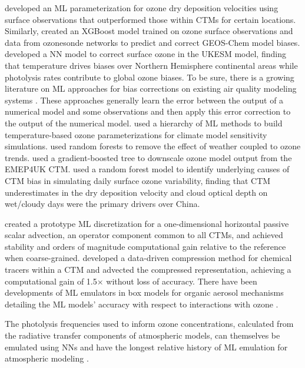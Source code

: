 \documentclass[gmd, manuscript]{copernicus}
\begin{document}
\citet{silva_deep_2019} developed an ML parameterization for ozone dry deposition velocities using surface observations that outperformed those within CTMs for certain locations. Similarly, \citet{ivatt_improving_2020} created an XGBoost model trained on ozone surface observations and data from ozonesonde networks to predict and correct GEOS-Chem model biases. \citet{liu_correcting_2022} developed a NN model to correct surface ozone in the UKESM model, finding that temperature drives biases over Northern Hemisphere continental areas while photolysis rates contribute to global ozone biases. To be sure, there is a growing literature on ML approaches for bias corrections on existing air quality modeling systems \citep{Neal2014, Borrego2011, Silibello2015}. These approaches generally learn the error between the output of a numerical model and some observations and then apply this error correction to the output of the numerical model. \citet{nowack_using_2018} used a hierarchy of ML methods to build temperature-based ozone parameterizations for climate model sensitivity simulations. \citet{colombi_why_2023} used random forests to remove the effect of weather coupled to ozone trends. \citet{Gouldsbrough2024} used a gradient-boosted tree to downscale ozone model output from the EMEP4UK CTM. \citet{ye_diagnosing_2022} used a random forest model to identify underlying causes of CTM bias in simulating daily surface ozone variability, finding that CTM underestimates in the dry deposition velocity and cloud optical depth on wet/cloudy days were the primary drivers over China. 
 
\citet{park_learned_2023} created a prototype ML discretization for a one-dimensional horizontal passive scalar advection, an operator component common to all CTMs, and achieved stability and orders of magnitude computational gain relative to the reference when coarse-grained. \citet{sturm_advecting_2023} developed a data-driven compression method for chemical tracers within a CTM and advected the compressed representation, achieving a computational gain of 1.5$\times$ without loss of accuracy. There have been developments of ML emulators in box models for organic aerosol mechanisms detailing the ML models’ accuracy with respect to interactions with ozone \citep{mouchel-vallon_toward_2023, schreck_neural_2022}.
 
The photolysis frequencies used to inform ozone concentrations, calculated from the radiative transfer components of atmospheric models, can themselves be emulated using NNs \citep{lagerquist_using_2021} and have the longest relative history of ML emulation for atmospheric modeling \citep{krasnopolsky_new_2005,krasnopolsky_decadal_2008}. 
\end{document}
